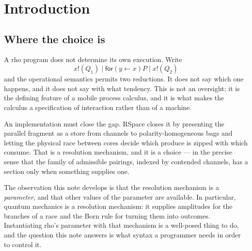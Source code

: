 \documentclass[11pt,a4paper]{article}
\theoremstyle{plain}
\theoremstyle{definition}
\theoremstyle{remark}
\begin{document}
\begin{abstract}
Finally we observe that the same slot accepts truth values in the sense of
Goertzel's Probabilistic Logic Networks. Valuing where-clauses by PLN inference
makes MeTTaIL's execution engine and its reasoning engine the same loop: what
fires next is decided by what the system currently believes. We give the
resolution algebra this requires, and are explicit about which part of PLN's
truth-value arithmetic supplies values and which part would have to be weakened
to supply the algebra. A second worked example --- a mortal forager whose
hypothesis is a PLN truth value in a \texttt{where} guard --- shows what the
grading buys: a Boolean guard has no coordinate in which to record
disappointment and cannot learn to stop, exploration and exploitation cease to
be scheduled, and PLN's personality parameter, elsewhere set by taste, acquires
an interior optimum fixed by the risk of the environment.
\end{abstract}

\tableofcontents

\section{Introduction}\label{sec:intro}

\subsection{Where the choice is}

A rho program does not determine its own execution. Write
\[
  x!(Q_1) \mid \textsf{for}(y \leftarrow x)P \mid x!(Q_2)
\]
and the operational semantics permits two reductions. It does not say which one
happens, and it does not say with what tendency. This is not an oversight; it is
the defining feature of a mobile process calculus, and it is what makes the
calculus a specification of interaction rather than of a machine.

An implementation must close the gap. RSpace closes it by presenting the parallel
fragment as a store from channels to polarity-homogeneous bags and letting the
physical race between cores decide which produce is zipped with which consume.
That is a resolution mechanism, and it is a choice --- in the precise sense that
the family of admissible pairings, indexed by contended channels, has a section
only when something supplies one.

The observation this note develops is that the resolution mechanism is a
\emph{parameter}, and that other values of the parameter are available. In
particular, quantum mechanics is a resolution mechanism: it supplies amplitudes
for the branches of a race and the Born rule for turning them into outcomes.
Instantiating rho's parameter with that mechanism is a well-posed thing to do,
and the question this note answers is what syntax a programmer needs in order to
control it.
\end{document}
